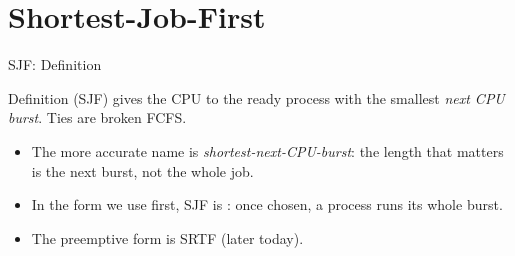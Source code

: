 \documentclass[aspectratio=169]{beamer}
\begin{document}

\section{Shortest-Job-First}

\begin{frame}{SJF: Definition}
  \begin{block}{Definition}
     (SJF) gives the CPU to the ready process with
    the smallest \emph{next CPU burst}. Ties are broken FCFS.
  \end{block}
  \begin{itemize}
    \item The more accurate name is \emph{shortest-next-CPU-burst}: the
      length that matters is the next burst, not the whole job.
    \item In the form we use first, SJF is : once chosen,
      a process runs its whole burst.
    \item The preemptive form is SRTF (later today).
  \end{itemize}
\end{frame}
\end{document}
